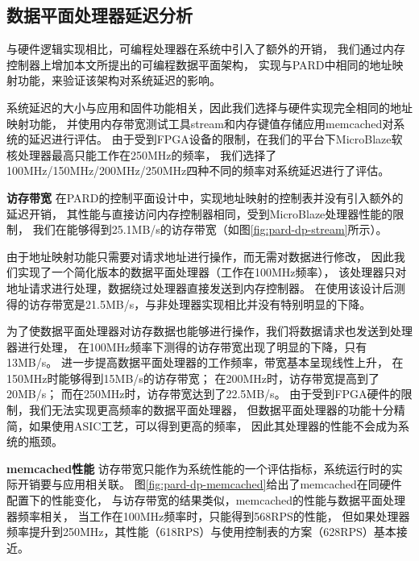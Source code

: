 \subsection{数据平面处理器延迟分析}
\label{chap:impl:dp-latency}


与硬件逻辑实现相比，可编程处理器在系统中引入了额外的开销，
我们通过内存控制器上增加本文所提出的可编程数据平面架构，
实现与PARD中相同的地址映射功能，来验证该架构对系统延迟的影响。

系统延迟的大小与应用和固件功能相关，因此我们选择与硬件实现完全相同的地址映射功能，
并使用内存带宽测试工具stream和内存键值存储应用memcached对系统的延迟进行评估。
由于受到FPGA设备的限制，在我们的平台下MicroBlaze软核处理器最高只能工作在250MHz的频率，
我们选择了100MHz/150MHz/200MHz/250MHz四种不同的频率对系统延迟进行了评估。

\textbf{访存带宽}\quad
在PARD的控制平面设计中，实现地址映射的控制表并没有引入额外的延迟开销，
其性能与直接访问内存控制器相同，受到MicroBlaze处理器性能的限制，
我们在能够得到25.1MB/s的访存带宽（如图\ref{fig:pard-dp-stream}所示）。

由于地址映射功能只需要对请求地址进行操作，而无需对数据进行修改，
因此我们实现了一个简化版本的数据平面处理器（工作在100MHz频率），
该处理器只对地址请求进行处理，数据绕过处理器直接发送到内存控制器。
在使用该设计后测得的访存带宽是21.5MB/s，与非处理器实现相比并没有特别明显的下降。

为了使数据平面处理器对访存数据也能够进行操作，我们将数据请求也发送到处理器进行处理，
在100MHz频率下测得的访存带宽出现了明显的下降，只有13MB/s。
进一步提高数据平面处理器的工作频率，带宽基本呈现线性上升，
在150MHz时能够得到15MB/s的访存带宽；
在200MHz时，访存带宽提高到了20MB/s；
而在250MHz时，访存带宽达到了22.5MB/s。
由于受到FPGA硬件的限制，我们无法实现更高频率的数据平面处理器，
但数据平面处理器的功能十分精简，如果使用ASIC工艺，可以得到更高的频率，
因此其处理器的性能不会成为系统的瓶颈。

\textbf{memcached性能}\quad
访存带宽只能作为系统性能的一个评估指标，系统运行时的实际开销要与应用相关联。
图\ref{fig:pard-dp-memcached}给出了memcached在同硬件配置下的性能变化，
与访存带宽的结果类似，memcached的性能与数据平面处理器频率相关，
当工作在100MHz频率时，只能得到568RPS的性能，
但如果处理器频率提升到250MHz，其性能（618RPS）与使用控制表的方案（628RPS）基本接近。

